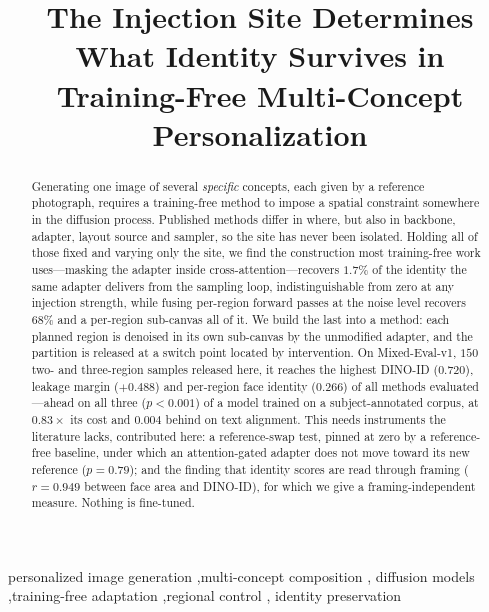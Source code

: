 \documentclass[review,10pt,times]{elsarticle}
\begin{document}
\linenumbers

\begin{frontmatter}

\title{The Injection Site Determines What Identity Survives
       in Training-Free Multi-Concept Personalization}

\begin{abstract}
Generating one image of several \emph{specific} concepts, each given
by a reference photograph, requires a training-free method to impose a spatial
constraint somewhere in the diffusion process.  Published methods
differ in where, but also in backbone, adapter, layout source and sampler, so
the site has never been isolated.  Holding all of those fixed and
varying only the site, we find the construction most training-free work
uses---masking the adapter inside cross-attention---recovers $1.7\%$ of the
identity the same adapter delivers from the sampling loop, indistinguishable
from zero at any injection strength, while fusing per-region forward passes at
the noise level recovers $68\%$ and a per-region sub-canvas all of
it.  We build the last into a method: each planned region is denoised
in its own sub-canvas by the unmodified adapter, and the partition is
released at a switch point located by intervention.  On Mixed-Eval-v1, $150$
two- and three-region samples released here, it reaches the highest DINO-ID
($0.720$), leakage margin ($+0.488$) and per-region face identity ($0.266$) of
all methods evaluated---ahead on all three ($p{<}0.001$) of a model trained
on a subject-annotated corpus, at $0.83\times$ its cost and $0.004$
behind on text alignment.  This needs
instruments the literature lacks, contributed here: a reference-swap test,
pinned at zero by a reference-free baseline, under which an attention-gated
adapter does not move toward its new reference ($p{=}0.79$); and the
finding that identity scores are read through framing ($r{=}0.949$ between
face area and DINO-ID), for which we give a framing-independent measure.
Nothing is fine-tuned.
\end{abstract}

\begin{keyword}
personalized image generation \sep multi-concept composition \sep
diffusion models \sep training-free adaptation \sep regional control \sep
identity preservation
\end{keyword}

\end{frontmatter}
\end{document}
